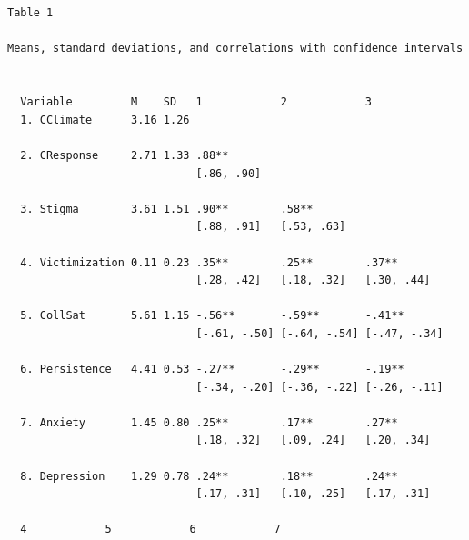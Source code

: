 \documentclass[
  english,
]{book}
\begin{document}
\begin{verbatim}


Table 1 

Means, standard deviations, and correlations with confidence intervals
 

  Variable         M    SD   1            2            3           
  1. CClimate      3.16 1.26                                       
                                                                   
  2. CResponse     2.71 1.33 .88**                                 
                             [.86, .90]                            
                                                                   
  3. Stigma        3.61 1.51 .90**        .58**                    
                             [.88, .91]   [.53, .63]               
                                                                   
  4. Victimization 0.11 0.23 .35**        .25**        .37**       
                             [.28, .42]   [.18, .32]   [.30, .44]  
                                                                   
  5. CollSat       5.61 1.15 -.56**       -.59**       -.41**      
                             [-.61, -.50] [-.64, -.54] [-.47, -.34]
                                                                   
  6. Persistence   4.41 0.53 -.27**       -.29**       -.19**      
                             [-.34, -.20] [-.36, -.22] [-.26, -.11]
                                                                   
  7. Anxiety       1.45 0.80 .25**        .17**        .27**       
                             [.18, .32]   [.09, .24]   [.20, .34]  
                                                                   
  8. Depression    1.29 0.78 .24**        .18**        .24**       
                             [.17, .31]   [.10, .25]   [.17, .31]  
                                                                   
  4            5            6            7         
                                                   
                                                   
                                                   
                                                   
                                                   

\end{verbatim}
\end{document}
